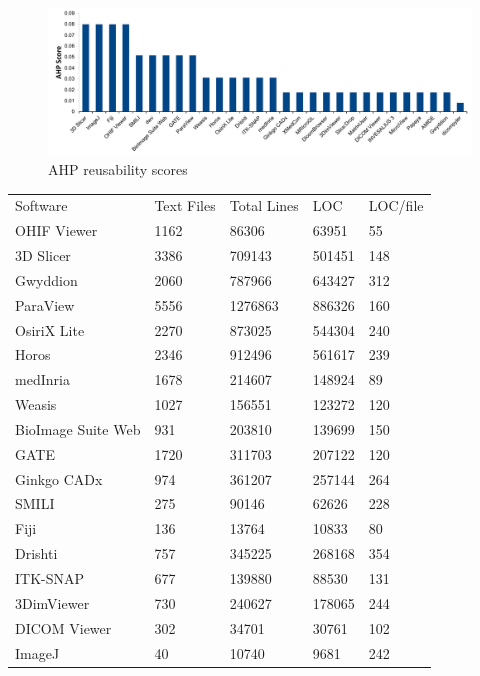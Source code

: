 \documentclass[11pt]{article}
\begin{document}
\begin{figure}[!ht]
\includegraphics[scale=0.47]{reusability_scores.pdf}
\caption{AHP reusability scores}
\label{fg_reusability_scores}
\end{figure}

\begin{table}[!ht]
\centering
\begin{tabular}{lllll}
\toprule
\multirow{2}{*}{Software} & \multirow{2}{*}{Text Files} & \multirow{2}{*}{Total Lines} & \multirow{2}{*}{LOC} & \multirow{2}{*}{LOC/file} \\
 &  &  &  &  \\ 
\midrule
OHIF Viewer & 1162 & 86306 & 63951 & 55 \\
3D Slicer & 3386 & 709143 & 501451 & 148 \\
Gwyddion & 2060 & 787966 & 643427 & 312 \\
ParaView & 5556 & 1276863 & 886326 & 160 \\
OsiriX Lite & 2270 & 873025 & 544304 & 240 \\
Horos & 2346 & 912496 & 561617 & 239 \\
medInria & 1678 & 214607 & 148924 & 89 \\
Weasis & 1027 & 156551 & 123272 & 120 \\
BioImage Suite Web & 931 & 203810 & 139699 & 150 \\
GATE & 1720 & 311703 & 207122 & 120 \\
Ginkgo CADx & 974 & 361207 & 257144 & 264 \\
SMILI & 275 & 90146 & 62626 & 228 \\
Fiji & 136 & 13764 & 10833 & 80 \\
Drishti & 757 & 345225 & 268168 & 354 \\
ITK-SNAP & 677 & 139880 & 88530 & 131 \\
3DimViewer & 730 & 240627 & 178065 & 244 \\
DICOM Viewer & 302 & 34701 & 30761 & 102 \\
ImageJ & 40 & 10740 & 9681 & 242 \\

\end{tabular}
\end{table}
\end{document}
